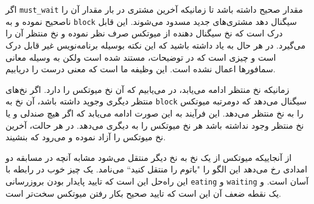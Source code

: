 \documentclass{book}
\newcommand{\clearemptydoublepage}{\newpage\cleardoublepage}
\begin{document}
    اگر {\tt must\_wait} مقدار صحیح داشته باشد تا زمانیکه آخرین مشتری در بار مقدار آن را ناصحیح نموده و به  {\tt block} سیگنال دهد مشتری‌های جدید 
    مسدود می‌شوند. این قابل درک است که نخ سیگنال دهنده از میوتکس صرف نظر نموده و نخ منتظر آن را می‌گیرد. در هر حال  به یاد داشته باشید که 
    این نکته بوسیله برنامه‌نویس غیر قابل درک است و چیزی است که در توضیحات، مستند شده است 
    ولکن به وسیله معانی سمافورها اعمال نشده است. این وظیفه ما است که معنی درست را دریابیم.

    زمانیکه نخ منتظر ادامه می‌یابد، در می‌یابیم که آن نخ میوتکس را دارد. اگر نخ‌های منتظر دیگری وجوپد داشته باشد، آن نخ به  {\tt block} سیگنال می‌دهد که 
    دومرتبه میوتکس را به نخ منتظر می‌دهد. این فرآیند به این صورت ادامه می‌یابد که  اگر هیچ صندلی و یا نخ منتظر وجود نداشته باشد هر نخ میوتکس را
    به دیگری می‌دهد. در هر حالت، آخرین نخ میوتکس را آزاد نموده و می‌رود که بنشیند. 
    

    از آنجاییکه میوتکس از یک نخ به نخ دیگر منتقل می‌شود مشابه آنچه در مسابقه دو امدادی رخ می‌دهد 
    این الگو را "باتوم را منتقل کنید‍‍`` می‌نامد.
    یک چیز خوب در رابطه با این راه‌حل این است که تایید پایدار بودن بروزرسانی  {\tt eating} و {\tt waiting} آسان است. و  یک نقطه ضعف آن 
    این است که تایید صحیح بکار رفتن میوتکس سخت‌تر است. 

\end{document}
